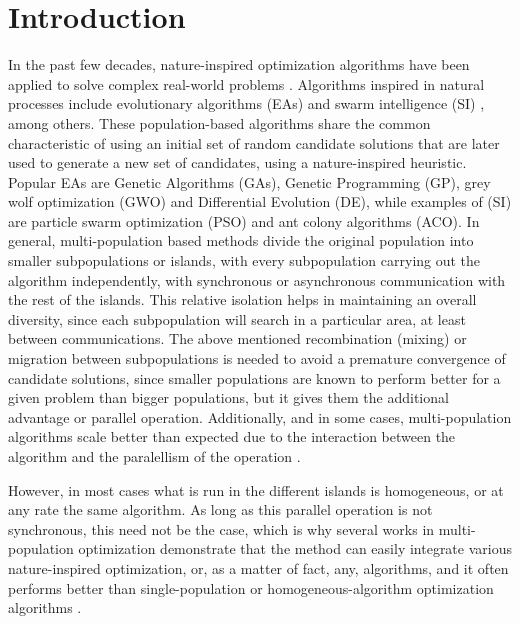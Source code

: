 \documentclass[runningheads]{llncs}
\begin{document}
\section{Introduction}

In the past few decades, nature-inspired optimization algorithms have been
applied to solve complex real-world problems \cite{yang2014nature}. Algorithms
inspired in natural processes  include evolutionary algorithms (EAs)
\cite{back1996evolutionary} and swarm intelligence (SI) \cite{kennedy2006swarm}, among others.
These population-based algorithms share the common characteristic of using an initial set of
random candidate solutions that are later used to generate a new set of
candidates, using a nature-inspired heuristic.
Popular EAs are Genetic Algorithms (GAs), Genetic Programming (GP), 
grey wolf optimization (GWO) and Differential Evolution (DE), 
while examples of (SI) are particle swarm optimization (PSO) and
ant colony algorithms (ACO).
%   
In general, multi-population based methods divide the original
population into smaller subpopulations or islands, with every subpopulation
carrying out the algorithm independently, with synchronous or asynchronous communication with the rest of the islands. This relative isolation helps in maintaining an overall diversity, since each subpopulation will search in a particular area, at least between communications. The above mentioned recombination (mixing) or
migration between subpopulations is needed to avoid a premature convergence of
candidate solutions, since smaller populations are known to perform
better for a given problem than bigger populations, but it gives them
the additional advantage or parallel operation. Additionally, and in
some cases, multi-population algorithms scale better than expected due
to the interaction between the algorithm and the paralellism of the
operation \cite{ALBA20027}.

However, in most cases what is run in the different islands is
homogeneous, or at any rate the same algorithm. As long as this
parallel operation is not synchronous, this need not be the case,
which is why several works in multi-population
optimization demonstrate that the method can easily
integrate various nature-inspired optimization, or, as a matter of
fact, any, algorithms, and it often performs
better than single-population  or homogeneous-algorithm optimization algorithms 
\cite{wu2016differential,nseef2016adaptive}.
\end{document}
